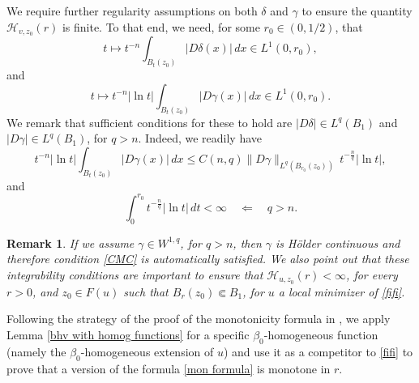 \documentclass[reqno,11pt]{amsart}
\newtheorem{remark}{Remark}[section]
\newcommand{\1}{\mathds{1}}
\numberwithin{equation}{section}
\begin{document}
We require further regularity assumptions on both $\delta$ and $\gamma$ to ensure the quantity $\mathcal{H}_{v,z_0}(r)$ is finite. To that end, we need, for some $r_0 \in (0,1/2)$, that
\begin{equation}\label{integra delta}
    t \mapsto t^{-n}\int_{B_t(z_0)}|D\delta(x)|\, dx \in L^1(0,r_0),
\end{equation}
and
\begin{equation}\label{integra gamma}
    t \mapsto t^{-n}|\ln t| \int_{B_t(z_0)}|D\gamma(x)|\, dx \in L^1(0,r_0).
\end{equation}
We remark that sufficient conditions for these to hold are $|D\delta| \in L^{q}(B_1)$ and $|D\gamma| \in L^{q}(B_1)$, for $q> n$. Indeed, we readily have
$$
    t^{-n}|\ln t|\int_{B_t(z_0)}|D\gamma(x)|\, dx \leq C(n,q) \|D\gamma\|_{L^q \left( B_{r_0}(z_0) \right)} \, t^{-\frac{n}{q}}|\ln t|,
$$
and
$$
    \int_0^{r_0} t^{-\frac{n}{q}}|\ln t|\, dt < \infty \quad \Longleftarrow \quad q>n.
$$

\begin{remark}
If we assume $\gamma \in W^{1,q}$, for $q>n$, then $\gamma$ is H\"older continuous and therefore condition \eqref{CMC} is automatically satisfied. We also point out that these integrability conditions are important to ensure that $\mathcal{H}_{u,z_0}(r) < \infty$, for every $r>0$, and $z_0 \in F(u)$ such that $B_r(z_0) \Subset B_1$, for $u$ a local minimizer of \eqref{fifi}.
\end{remark}

Following the strategy of the proof of the monotonicity formula in \cite{DSS2}, we apply Lemma \ref{bhv with homog functions} for a specific $\beta_0$-homogeneous function (namely the $\beta_0$-homogeneous extension of $u$) and use it as a competitor to \eqref{fifi} to prove that a version of the formula \eqref{mon formula} is monotone in $r$.
\end{document}

